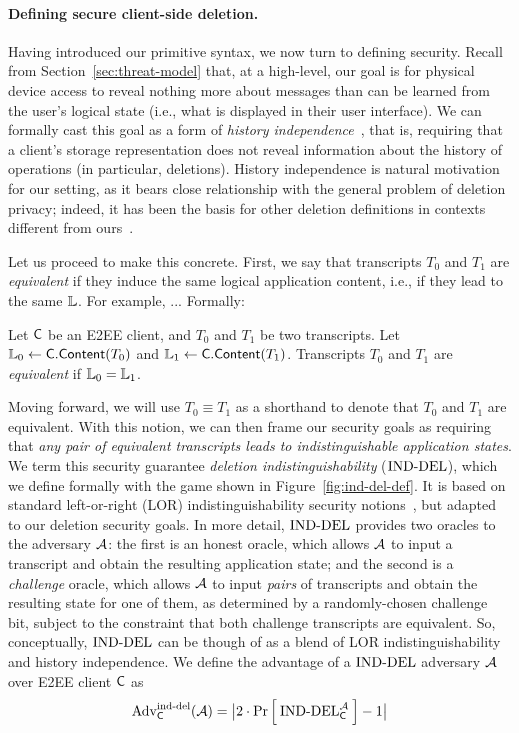 \paragraph{Defining secure client-side deletion.} Having introduced our primitive syntax, we now turn to defining security. Recall from Section~\ref{sec:threat-model} that, at a high-level, our goal is for physical device access to reveal nothing more about messages than can be learned from the user's logical state (i.e., what is displayed in their user interface). We can formally cast this goal as a form of \emph{history independence}~\cite{micciancio1997oblivious,naor2001anti}, that is, requiring that a client's storage representation does not reveal information about the history of operations (in particular, deletions). History independence is natural motivation for our setting, as it bears close relationship with the general problem of deletion privacy; indeed, it has been the basis for other deletion definitions in contexts different from ours~\cite{cohen2023control}.

Let us proceed to make this concrete. First, we say that transcripts $T_0$ and $T_1$ are \emph{equivalent} if they induce the same logical application content, i.e., if they lead to the same $\mathbb{L}$. For example, ... Formally:
\begin{definition}\label{def:transcript-equivalence}
    Let $\mathsf{C}$ be an E2EE client, and $T_0$ and $T_1$ be two transcripts. Let $\mathbb{L}_0 \gets \mathsf{C}.\mathsf{Content}(T_0)$ and $\mathbb{L}_1 \gets \mathsf{C}.\mathsf{Content}(T_1)$. Transcripts $T_0$ and $T_1$ are \emph{equivalent} if $\mathbb{L}_0 = \mathbb{L}_1$.
\end{definition}
Moving forward, we will use $T_0 \equiv T_1$ as a shorthand to denote that $T_0$ and $T_1$ are equivalent.  With this notion, we can then frame our security goals as requiring that \emph{any pair of equivalent transcripts leads to indistinguishable application states}.
We term this security guarantee \emph{deletion indistinguishability} ($\textnormal{IND-DEL}$), which we define formally with the game shown in Figure~\ref{fig:ind-del-def}. It is based on standard left-or-right (LOR) indistinguishability security notions~\cite{}, but adapted to our deletion security goals. In more detail, $\textnormal{IND-DEL}$ provides two oracles to the adversary $\mathcal{A}$: the first is an honest oracle, which allows $\mathcal{A}$ to input a transcript and obtain the resulting application state; and the second is a \emph{challenge} oracle, which allows $\mathcal{A}$ to input \emph{pairs} of transcripts and obtain the resulting state for one of them, as determined by a randomly-chosen challenge bit, subject to the constraint that both challenge transcripts are equivalent. So, conceptually, $\textnormal{IND-DEL}$ can be though of as a blend of LOR indistinguishability and history independence. We define the advantage of a $\textnormal{IND-DEL}$ adversary $\mathcal{A}$ over E2EE client $\mathsf{C}$ as 
\[\textnormal{Adv}^{\textup{ind-del}}_{\mathsf{C}}(\mathcal{A}) = \big|2 \cdot \Pr\left[\: \textnormal{IND-DEL}^{\mathcal{A}}_{\mathsf{C}} \:\right] - 1\big|\]

